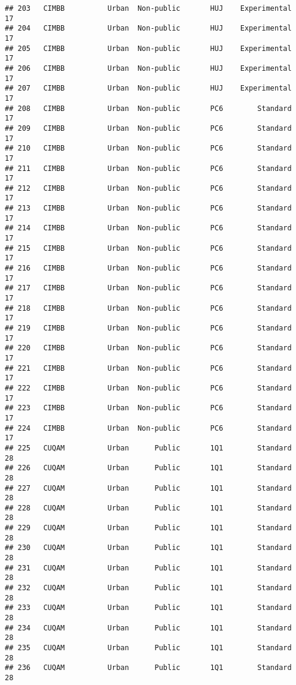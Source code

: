 \documentclass[
]{article}
\begin{document}
\begin{verbatim}
## 203   CIMBB          Urban  Non-public       HUJ    Experimental        17
## 204   CIMBB          Urban  Non-public       HUJ    Experimental        17
## 205   CIMBB          Urban  Non-public       HUJ    Experimental        17
## 206   CIMBB          Urban  Non-public       HUJ    Experimental        17
## 207   CIMBB          Urban  Non-public       HUJ    Experimental        17
## 208   CIMBB          Urban  Non-public       PC6        Standard        17
## 209   CIMBB          Urban  Non-public       PC6        Standard        17
## 210   CIMBB          Urban  Non-public       PC6        Standard        17
## 211   CIMBB          Urban  Non-public       PC6        Standard        17
## 212   CIMBB          Urban  Non-public       PC6        Standard        17
## 213   CIMBB          Urban  Non-public       PC6        Standard        17
## 214   CIMBB          Urban  Non-public       PC6        Standard        17
## 215   CIMBB          Urban  Non-public       PC6        Standard        17
## 216   CIMBB          Urban  Non-public       PC6        Standard        17
## 217   CIMBB          Urban  Non-public       PC6        Standard        17
## 218   CIMBB          Urban  Non-public       PC6        Standard        17
## 219   CIMBB          Urban  Non-public       PC6        Standard        17
## 220   CIMBB          Urban  Non-public       PC6        Standard        17
## 221   CIMBB          Urban  Non-public       PC6        Standard        17
## 222   CIMBB          Urban  Non-public       PC6        Standard        17
## 223   CIMBB          Urban  Non-public       PC6        Standard        17
## 224   CIMBB          Urban  Non-public       PC6        Standard        17
## 225   CUQAM          Urban      Public       1Q1        Standard        28
## 226   CUQAM          Urban      Public       1Q1        Standard        28
## 227   CUQAM          Urban      Public       1Q1        Standard        28
## 228   CUQAM          Urban      Public       1Q1        Standard        28
## 229   CUQAM          Urban      Public       1Q1        Standard        28
## 230   CUQAM          Urban      Public       1Q1        Standard        28
## 231   CUQAM          Urban      Public       1Q1        Standard        28
## 232   CUQAM          Urban      Public       1Q1        Standard        28
## 233   CUQAM          Urban      Public       1Q1        Standard        28
## 234   CUQAM          Urban      Public       1Q1        Standard        28
## 235   CUQAM          Urban      Public       1Q1        Standard        28
## 236   CUQAM          Urban      Public       1Q1        Standard        28

\end{verbatim}
\end{document}
